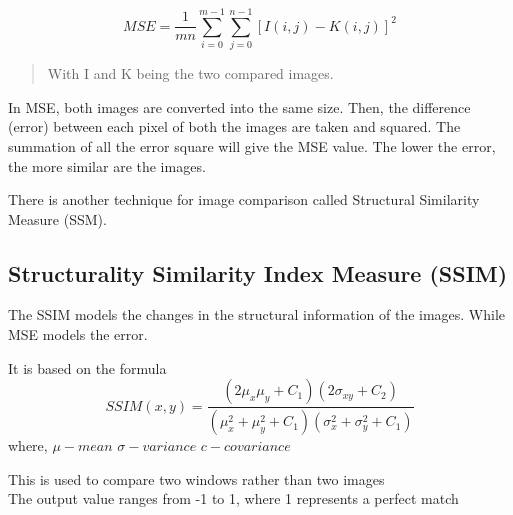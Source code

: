 \documentclass{article}
\begin{document}
 
 \begin{equation}
  MSE = \frac{1}{mn}   \sum^{m-1}_{i=0}  \sum^{n-1}_{j=0} [I(i,j) - K(i,j)] ^2
\end{equation}  
\begin{quote}
With I and K being the two compared images.
\end{quote}


In MSE, both images are converted into the same size. Then, the difference (error) between each pixel of both the images are taken and squared. The summation of all the error square will give the MSE value. 
The lower the error, the more similar are the images. 

There is another technique for image comparison called Structural Similarity Measure (SSM). 

\subsection*{Structurality Similarity Index Measure (SSIM)}

The SSIM models the changes in the structural information of the images. While MSE models the error. 

It is based on the formula \cite{third}
\begin{equation}
SSIM(x,y) = \frac{(2\mu_{x}\mu_{y}+C_{1})(2\sigma_{xy}+C_{2})}{(\mu^{2}_{x}+\mu^{2}_{y}+C_{1})(\sigma^{2}_{x}+\sigma^{2}_{y}+C_{1})}
\end{equation}
where, 
$\mu - mean $
$\sigma - variance $
$c - covariance $

This is used to compare two windows rather than two images \\ 
The output value ranges from -1 to 1, where 1 represents a perfect match

\end{document}
